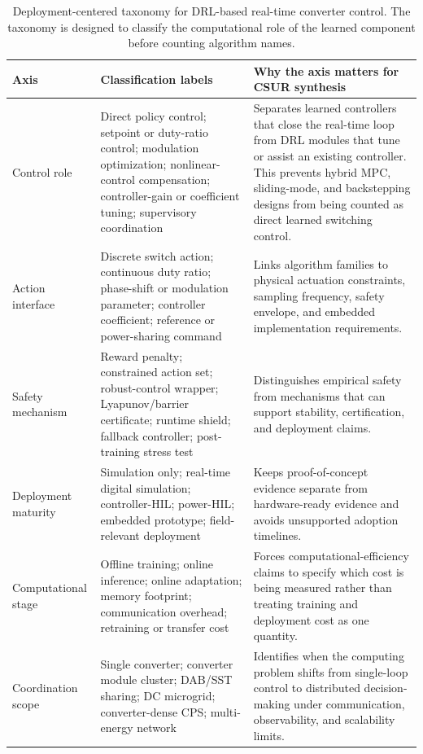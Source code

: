 \documentclass[manuscript,screen,review]{acmart}
\begin{document}
\begin{table}[t]
\caption{Deployment-centered taxonomy for DRL-based real-time converter control. The taxonomy is designed to classify the computational role of the learned component before counting algorithm names.}
\label{tab:deployment-taxonomy}
\begin{tabular}{p{}p{}p{}}
\toprule
Axis & Classification labels & Why the axis matters for CSUR synthesis \\
\midrule
Control role & Direct policy control; setpoint or duty-ratio control; modulation optimization; nonlinear-control compensation; controller-gain or coefficient tuning; supervisory coordination & Separates learned controllers that close the real-time loop from DRL modules that tune or assist an existing controller. This prevents hybrid MPC, sliding-mode, and backstepping designs from being counted as direct learned switching control. \\
Action interface & Discrete switch action; continuous duty ratio; phase-shift or modulation parameter; controller coefficient; reference or power-sharing command & Links algorithm families to physical actuation constraints, sampling frequency, safety envelope, and embedded implementation requirements. \\
Safety mechanism & Reward penalty; constrained action set; robust-control wrapper; Lyapunov/barrier certificate; runtime shield; fallback controller; post-training stress test & Distinguishes empirical safety from mechanisms that can support stability, certification, and deployment claims. \\
Deployment maturity & Simulation only; real-time digital simulation; controller-HIL; power-HIL; embedded prototype; field-relevant deployment & Keeps proof-of-concept evidence separate from hardware-ready evidence and avoids unsupported adoption timelines. \\
Computational stage & Offline training; online inference; online adaptation; memory footprint; communication overhead; retraining or transfer cost & Forces computational-efficiency claims to specify which cost is being measured rather than treating training and deployment cost as one quantity. \\
Coordination scope & Single converter; converter module cluster; DAB/SST sharing; DC microgrid; converter-dense CPS; multi-energy network & Identifies when the computing problem shifts from single-loop control to distributed decision-making under communication, observability, and scalability limits. \\
\bottomrule
\end{tabular}
\end{table}
\end{document}

